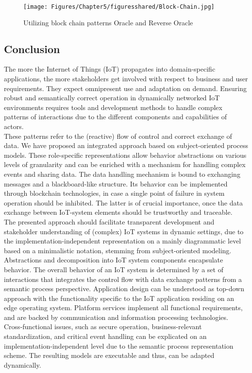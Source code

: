 \begin{figure}[htbp]
	\centering
	\texttt{[image: Figures/Chapter5/figuresshared/Block-Chain.jpg]}
	\caption[Utilizing block chain patterns Oracle and Reverse Oracle]{Utilizing block chain patterns Oracle and Reverse Oracle}
	\label{fig:sharedblockchain}
\end{figure}

\subsection {Conclusion}
The more the Internet of Things (IoT) propagates into domain-specific applications, the more stakeholders get involved with respect to business and user requirements. They expect omnipresent use and adaptation on demand. Ensuring robust and semantically correct operation in dynamically networked IoT environments requires tools and development methods to handle complex patterns of interactions due to the different components and capabilities of actors.\\
These patterns refer to the (reactive) flow of control and correct exchange of data. We have proposed an integrated approach based on subject-oriented process models. These role-specific representations allow behavior abstractions on various levels of granularity and can be enriched with a mechanism for handling complex events and sharing data. The data handling mechanism is bound to exchanging messages and a blackboard-like structure. Its behavior can be implemented through blockchain technologies, in case a single point of failure in system operation should be inhibited. The latter is of crucial importance, once the data exchange between IoT-system elements should be trustworthy and traceable.\\
The presented approach should facilitate transparent development and stakeholder understanding of (complex) IoT systems in dynamic settings, due to the implementation-independent representation on a mainly diagrammatic level based on a minimalistic notation, stemming from subject-oriented modeling. Abstractions and decomposition into IoT system components encapsulate behavior. The overall behavior of an IoT system is determined by a set of interactions that integrates the control flow with data exchange patterns from a semantic process perspective. Application design can be understood as top-down approach with the functionality specific to the IoT application residing on an edge operating system. Platform services implement all functional requirements, and are backed by communication and information processing technologies. Cross-functional issues, such as secure operation, business-relevant standardization, and critical event handling can be explicated on an implementation-independent level due to the semantic process representation scheme. The resulting models are executable and thus, can be adapted dynamically.


